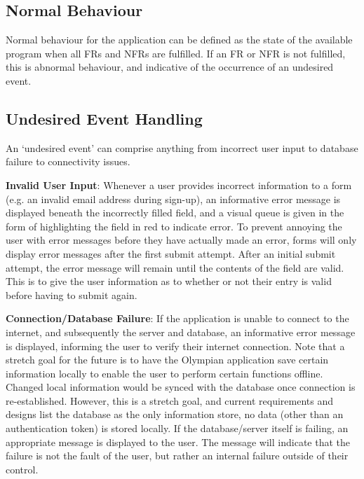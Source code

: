 \documentclass[12pt, titlepage]{article}
\begin{document}
	\subsection{Normal Behaviour}
  
	Normal behaviour for the application can be defined as the state of the available program when all FRs and NFRs are fulfilled. If an FR or NFR is not fulfilled, this is abnormal behaviour, and indicative of the occurrence of an undesired event.
	
	\subsection{Undesired Event Handling}
	
	
	An `undesired event' can comprise anything from incorrect user input to database failure to connectivity issues. 
	
	\textbf{Invalid User Input}: Whenever a user provides incorrect information to a form (e.g. an invalid email address during sign-up), an informative error message is displayed beneath the incorrectly filled field, and a visual queue is given in the form of highlighting the field in red to indicate error. To prevent annoying the user with error messages before they have actually made an error, forms will only display error messages after the first submit attempt. After an initial submit attempt, the error message will remain until the contents of the field are valid. This is to give the user information as to whether or not their entry is valid before having to submit again.
	
	\textbf{Connection/Database Failure}: If the application is unable to connect to the internet, and subsequently the server and database, an informative error message is displayed, informing the user to verify their internet connection. Note that a stretch goal for the future is to have the Olympian application save certain information locally to enable the user to perform certain functions offline. Changed local information would be synced with the database once connection is re-established. However, this is a stretch goal, and current requirements and designs list the database as the only information store, no data (other than an authentication token) is stored locally. If the database/server itself is failing, an appropriate message is displayed to the user. The message will indicate that the failure is not the fault of the user, but rather an internal failure outside of their control.
	\\
	
\end{document}
